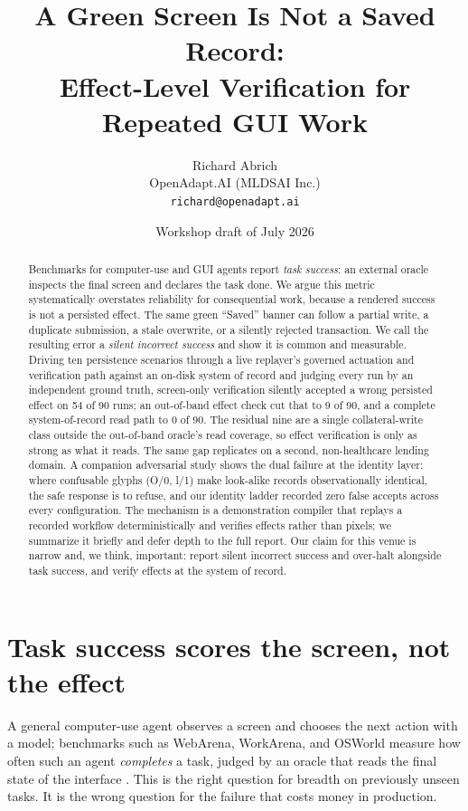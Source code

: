\documentclass[10pt]{article}
\title{A Green Screen Is Not a Saved Record:\\
Effect-Level Verification for Repeated GUI Work}
\author{Richard Abrich\\OpenAdapt.AI (MLDSAI Inc.)\\\texttt{richard@openadapt.ai}}
\date{Workshop draft of July 2026}
\begin{document}
\maketitle

\begin{abstract}
Benchmarks for computer-use and GUI agents report \emph{task success}: an
external oracle inspects the final screen and declares the task done. We argue
this metric systematically overstates reliability for consequential work,
because a rendered success is not a persisted effect. The same green ``Saved''
banner can follow a partial write, a duplicate submission, a stale overwrite, or
a silently rejected transaction. We call the resulting error a \emph{silent
incorrect success} and show it is common and measurable. Driving ten persistence
scenarios through a live replayer's governed actuation and verification path
against an on-disk system of record
and judging every run by an independent ground truth, screen-only verification
silently accepted a wrong persisted effect on 54 of 90 runs; an out-of-band
effect check cut that to 9 of 90, and a complete system-of-record read path to 0
of 90. The residual nine are a single collateral-write class outside the
out-of-band oracle's read coverage, so effect verification is only as strong as
what it reads. The same gap replicates on a second, non-healthcare lending
domain. A companion adversarial study shows the dual failure at the
identity layer: where confusable glyphs (O/0, l/1) make look-alike records
observationally identical, the safe response is to refuse, and our identity
ladder recorded zero false accepts across every configuration. The mechanism is a
demonstration compiler that replays a recorded workflow deterministically and
verifies effects rather than pixels; we summarize it briefly and defer depth to
the full report. Our claim for this venue is narrow and, we think, important:
report silent incorrect success and over-halt alongside task success, and verify
effects at the system of record.
\end{abstract}

\section{Task success scores the screen, not the effect}
\label{sec:intro}

A general computer-use agent observes a screen and chooses the next action with a
model; benchmarks such as WebArena, WorkArena, and OSWorld measure how often such
an agent \emph{completes} a task, judged by an oracle that reads the final state
of the interface \cite{webarena,workarena,osworld}. This is the right question
for breadth on previously unseen tasks. It is the wrong question for the failure
that costs money in production.
\end{document}
